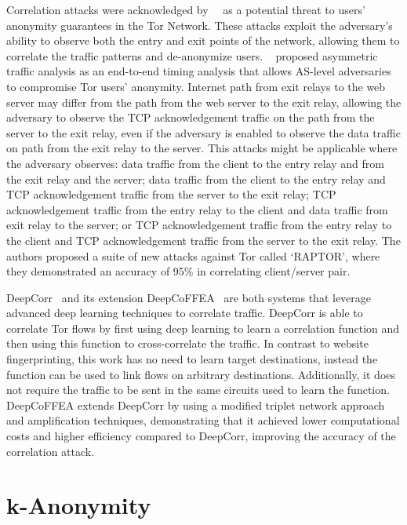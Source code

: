 Correlation attacks were acknowledged by~\citeauthor{dingledine2004tor}~\cite{dingledine2004tor} as a potential threat to users' anonymity guarantees in the Tor Network. These attacks exploit the adversary's ability to observe both the entry and exit points of the network, allowing them to correlate the traffic patterns and de-anonymize users.
\citeauthor{RAPTOR}~\cite{RAPTOR} proposed asymmetric traffic analysis as an end-to-end timing analysis that allows AS-level adversaries to compromise Tor users' anonymity. Internet path from exit relays to the web server may differ from the path from the web server to the exit relay, allowing the adversary to observe the TCP acknowledgement traffic on the path from the server to the exit relay, even if the adversary is enabled to observe the data traffic on path from the exit relay to the server. This attacks might be applicable where the adversary observes: data traffic from the client to the entry relay and from the exit relay and the server; data traffic from the client to the entry relay and TCP acknowledgement traffic from the server to the exit relay; TCP acknowledgement traffic from the entry relay to the client and data traffic from exit relay to the server; or TCP acknowledgement traffic from the entry relay to the client and TCP acknowledgement traffic from the server to the exit relay. The authors proposed a suite of new attacks against Tor called `RAPTOR', where they demonstrated an accuracy of 95\% in correlating client/server pair. 

DeepCorr~\cite{DeepCorr} and its extension DeepCoFFEA~\cite{DeepCoFFEA} are both systems that leverage advanced deep learning techniques to correlate traffic. DeepCorr is able to correlate Tor flows by first using deep learning to learn a correlation function and then using this function to cross-correlate the traffic. In contrast to website fingerprinting, this work has no need to learn target destinations, instead the function can be used to link flows on arbitrary destinations. Additionally, it does not require the traffic to be sent in the same circuits used to learn the function. DeepCoFFEA extends DeepCorr by using a modified triplet network approach and amplification techniques, demonstrating that it achieved lower computational costs and higher efficiency compared to DeepCorr, improving the accuracy of the correlation attack.


\section{k-Anonymity}\label{sec:k_anonymity}


